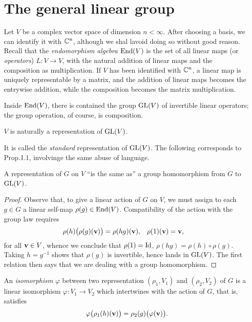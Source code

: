 \section{The general linear group}
Let \(V\) be a complex vector space of dimension \(n<\infty\). After
choosing a basis, we can identify it with \(\mathbb{C}^n\), although we shal
lavoid doing so without good reason. Recall that the \emph{endomorphism
  algebra \(\operatorname{End}(V)\)} is the set of all linear maps (or \emph{operators})
\(L\colon V\to V\), with the natural addition of linear maps and the
composition as multiplication. If \(V\) has been identified with
\(\mathbb{C}^n\), a linear map is uniquely representable by a matrix, and the
addition of linear maps becomes the entrywise addition, while the
composition becomes the matrix multiplication.

Inside \(\operatorname{End}(V)\), there is contained the group \(\operatorname{GL}(V)\) of invertible
linear operators; the group operation, of course, is composition.

\begin{proposition}
  \(V\) is naturally a representation of \(\operatorname{GL}(V)\).
\end{proposition}
It is called the \emph{standard} representation of \(\operatorname{GL}(V)\). The following
corresponds to Prop.\@ 1.1, involvinge the same abuse of language.

\begin{proposition}
  A representation of \(G\) on \(V\) ``is the same as'' a group
  homomorphism from \(G\) to \(\operatorname{GL}(V)\).
\end{proposition}
\begin{proof}
  Observe that, to give a linear action of \(G\) on \(V\), we must assign
  to each \(g\in G\) a linear self-map \(\rho(g)\in\operatorname{End}(V)\). Compatibility
  of the action with the group law requires
  \begin{align*}
    \rho(h)\bigl(\rho(g)(\mathbf{v})\bigr)&=\rho(hg)(\mathbf{v}),
    &\rho(1)(\mathbf{v})&=\mathbf{v},
  \end{align*}
  for all \(\mathbf{v}\in V\), whence we conclude that \(\rho(1)=\operatorname{Id}\),
  \(\rho(hg)=\rho(h)\circ\rho(g)\). Taking \(h=g^{-1}\) shows that
  \(\rho(g)\) is invertible, hence lands in \(\operatorname{GL}(V)\). The first relation
  then says that we are dealing with a group homomorphism.
\end{proof}

\begin{definition}
  An \emph{isomorphism \(\varphi\)} between two representation
  \((\rho_1,V_1)\) and \((\rho_2,V_2)\) of \(G\) is a linear isomorphism
  \(\varphi\colon V_1\to V_2\) which intertwines with the action of \(G\),
  that is, satisfies
  \[
    \varphi\bigl(\rho_1(h)(\mathbf{v})\bigr)=\rho_2(g)\bigl(\varphi(\mathbf{v})\bigr).
  \]
\end{definition}

